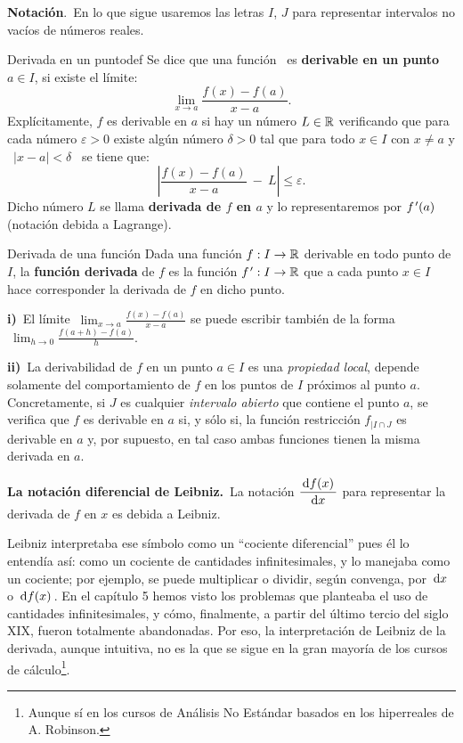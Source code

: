 \noindent \textbf{Notación}.\ En lo que sigue usaremos las letras
$I$, $J$ para representar intervalos no vacíos de números reales.

\begin{defi}{Derivada en un punto}{def}\label{def:derivada} Se dice
que una función \ es \textbf{derivable en un punto
$a\in I$}, si existe el límite: 
\[
\lim_{x\to a}\frac{f(x)-f(a)}{x-a}.
\]
Explícitamente, $f$ es derivable en $a$ si hay un número $L\in\mathbb R$
verificando que para cada número $\varepsilon>0$ existe algún número
$\delta>0$ tal que para todo $x\in I$ con $x\neq a$ y %
\mbox{%
$\mid x-a\mid<\delta$%
} se tiene que: 
\[
\left|\frac{f(x)-f(a)}{x-a}\ -\ L\right|\leqslant\varepsilon.
\]
Dicho número $L$ se llama \textbf{derivada de $f$ en $a$} y lo
representaremos por $f\mbox{$^{\mspace{2mu}\prime}$}(a)$ (notación debida a Lagrange). \end{defi}

\begin{defi}{Derivada de una función}{} Dada una función $f:I\rightarrow\mathbb R$
derivable en todo punto de $I$, la \textbf{función derivada} de $f$
es la función $f\mbox{$^{\mspace{2mu}\prime}$}:I\rightarrow\mathbb R$ que a cada punto $x\in I$ hace
corresponder la derivada de $f$ en dicho punto. \end{defi}

\begin{ideabox}\label{ob:propiedadlocalderivada} \textbf{i)}\ El
límite $\ {\displaystyle \lim_{x\to a}\frac{f(x)-f(a)}{x-a}}$ se
puede escribir también de la forma $\ {\displaystyle \lim_{h\to0}\frac{f(a+h)-f(a)}{h}.}$

\noindent \textbf{ii)}\ La derivabilidad de $f$ en un punto $a\in I$
es una \emph{propiedad local}, depende solamente del comportamiento
de $f$ en los puntos de $I$ próximos al punto $a$. Concretamente,
si $J$ es cualquier \emph{intervalo abierto} que contiene el punto
$a$, se verifica que $f$ es derivable en $a$ si, y sólo si, la
función restricción $f_{|I\cap J}$ es derivable en $a$ y, por supuesto,
en tal caso ambas funciones tienen la misma derivada en $a$. \end{ideabox}

\noindent \textbf{La notación diferencial de Leibniz.}\ La notación
$\dfrac{\,\mathrm{d}f(x)\,}{\,\mathrm{d}x\,}$ para representar la derivada de $f$
en $x$ es debida a Leibniz.

Leibniz interpretaba ese símbolo como un ``cociente diferencial''
pues él lo entendía así: como un cociente de cantidades infinitesimales,
y lo manejaba como un cociente; por ejemplo, se puede multiplicar
o dividir, según convenga, por $\,\mathrm{d}x\,$ o $\,\mathrm{d}f(x)\,$. En el capítulo
5 hemos visto los problemas que planteaba el uso de cantidades infinitesimales,
y cómo, finalmente, a partir del último tercio del siglo XIX, fueron
totalmente abandonadas. Por eso, la interpretación de Leibniz de la
derivada, aunque intuitiva, no es la que se sigue en la gran mayoría
de los cursos de cálculo\footnote{Aunque sí en los cursos de Análisis No Estándar basados en los hiperreales
de A. Robinson.}.

